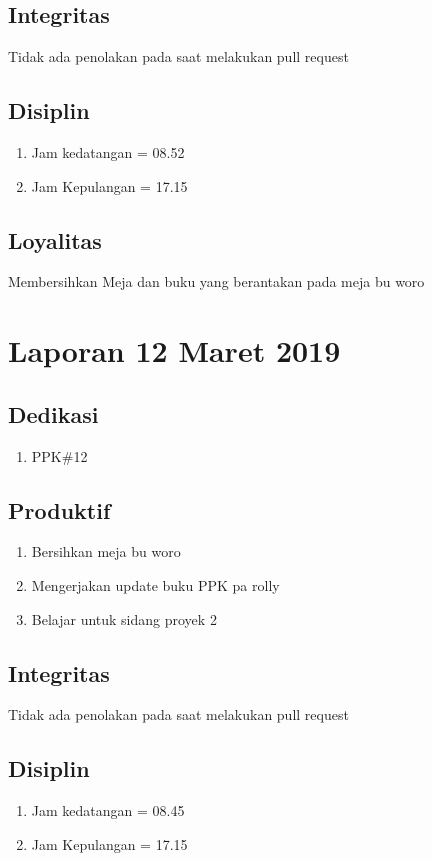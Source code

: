 \subsection{Integritas}
Tidak ada penolakan pada saat melakukan pull request
\subsection{Disiplin}
\begin{enumerate}
\item Jam kedatangan = 08.52
\item Jam Kepulangan = 17.15
\end{enumerate}
\subsection{Loyalitas}
 Membersihkan Meja dan buku yang berantakan pada meja bu woro

\section{Laporan 12 Maret 2019}
\subsection{Dedikasi}
\begin{enumerate}
\item PPK\#12
\end{enumerate}
\subsection{Produktif}
\begin{enumerate}
\item Bersihkan meja bu woro
\item Mengerjakan update buku PPK pa rolly
\item Belajar untuk sidang proyek 2
\end{enumerate}
\subsection{Integritas}
Tidak ada penolakan pada saat melakukan pull request
\subsection{Disiplin}
\begin{enumerate}
\item Jam kedatangan = 08.45
\item Jam Kepulangan = 17.15
\end{enumerate}
